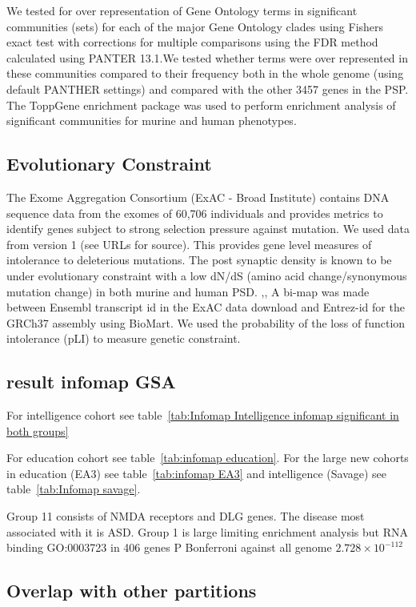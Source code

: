  We tested for over representation of Gene Ontology terms in significant communities (sets) for each of the major Gene Ontology clades using Fishers exact test with corrections for multiple comparisons using the FDR method calculated using PANTER 13.1.\cite{mi2013large}We tested whether terms were over represented in these communities compared to their frequency both in the whole genome (using default  PANTHER settings) and compared with the  other 3457 genes in the PSP. \cite{mi2013large}  The ToppGene enrichment package was used to perform enrichment analysis of significant communities for murine and human phenotypes. \cite{chen2009toppgene}  

\subsection{Evolutionary Constraint}

The Exome Aggregation Consortium (ExAC - Broad Institute) contains DNA sequence data from the exomes of 60,706 individuals and provides metrics to identify genes subject to strong selection pressure against mutation. \cite{lek2016analysis}  We used data from version 1 (see URLs for source). This provides gene level measures of intolerance to deleterious mutations. The post synaptic density is known to be under evolutionary constraint with a low dN/dS (amino acid change/synonymous mutation change) in both murine and human PSD. \cite{ryan2009origin},\cite{bayes2012comparative},\cite{bayes2011characterization}  A bi-map was made between Ensembl transcript id in the ExAC data download and Entrez-id for the GRCh37 assembly using BioMart. \cite{smedley2015biomart}  We used the probability of the loss of function intolerance (pLI) to measure genetic constraint.
 


\subsection{result infomap GSA}
For intelligence cohort see table~\ref{tab:Infomap Intelligence infomap significant in both groups}

For education cohort see table~\ref{tab:infomap education}. For the large new cohorts in education (EA3) see table~\ref{tab:infomap EA3} and intelligence (Savage) see table~\ref{tab:Infomap savage}.

Group 11 consists of NMDA receptors and DLG genes. The disease most associated with it is ASD. Group 1 is large limiting enrichment analysis but RNA binding GO:0003723 in 406 genes P Bonferroni against all genome $2.728 \times 10^{-112}$ \subsection{Overlap with other partitions}

